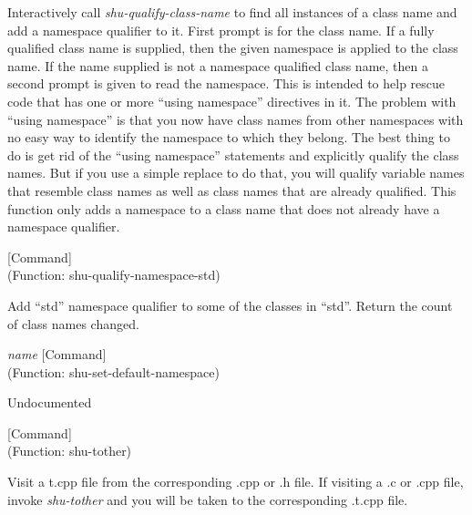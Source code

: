 \begin{doc-string}
Interactively call \emph{shu-qualify-class-name} to find all instances of a class name and
add a namespace qualifier to it.  First prompt is for the class name.  If a fully qualified
class name is supplied, then the given namespace is applied to the class name.  If the name
supplied is not a namespace qualified class name, then a second prompt is given to read the
namespace.
This is intended to help rescue code that has one or more ``using namespace''
directives in it.  The problem with ``using namespace'' is that you now have
class names from other namespaces with no easy way to identify the namespace
to which they belong.  The best thing to do is get rid of the ``using
namespace'' statements and explicitly qualify the class names.  But if you
use a simple replace to do that, you will qualify variable names that resemble
class names as well as class names that are already qualified.  This function
only adds a namespace to a class name that does not already have a namespace
qualifier.
\end{doc-string}

\vspace{1em}
\noindent
{}
\usebox{\funcname}
 \hfill [Command]\\%
 (Function: shu-qualify-namespace-std)

\begin{doc-string}
Add ``std'' namespace qualifier to some of the classes in ``std''.  Return the
count of class names changed.
\end{doc-string}

\vspace{1em}
\noindent
{}
\usebox{\funcname}\emph{name}
 \hfill [Command]\\%
 (Function: shu-set-default-namespace)

\begin{doc-string}
Undocumented
\end{doc-string}

\vspace{1em}
\noindent
{}
\usebox{\funcname}
 \hfill [Command]\\%
 (Function: shu-tother)

\begin{doc-string}
Visit a t.cpp file from the corresponding .cpp or .h file.  If visiting a .c or
.cpp file, invoke \emph{shu-tother} and you will be taken to the corresponding .t.cpp
file.
\end{doc-string}

